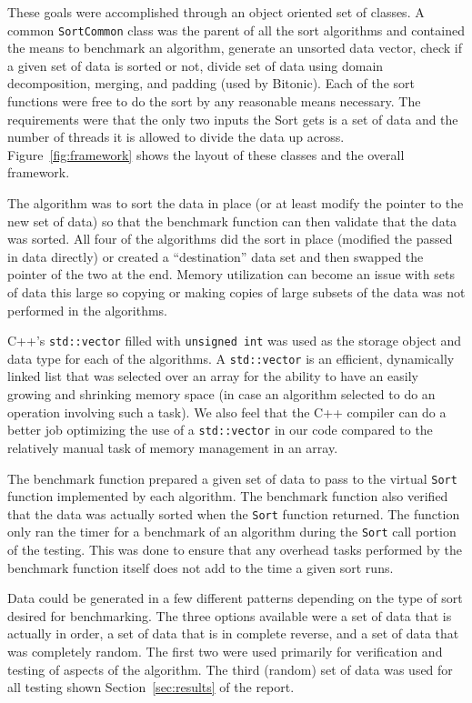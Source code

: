 \documentclass[journal]{IEEEtran}
\begin{document}
These goals were accomplished through an object oriented set of classes. A common \texttt{SortCommon} class was the parent of all the sort algorithms and contained the means to benchmark an algorithm, generate an unsorted data vector, check if a given set of data is sorted or not, divide set of data using domain decomposition, merging, and padding (used by Bitonic). Each of the sort functions were free to do the sort by any reasonable means necessary. The requirements were that the only two inputs the Sort gets is a set of data and the number of threads it is allowed to divide the data up across. Figure~\ref{fig:framework} shows the layout of these classes and the overall framework.

The algorithm was to sort the data in place (or at least modify the pointer to the new set of data) so that the benchmark function can then validate that the data was sorted. All four of the algorithms did the sort in place (modified the passed in data directly) or created a ``destination'' data set and then swapped the pointer of the two at the end. Memory utilization can become an issue with sets of data this large so copying or making copies of large subsets of the data was not performed in the algorithms.

C++'s \texttt{std::vector} filled with \texttt{unsigned int} was used as the storage object and data type for each of the algorithms. A \texttt{std::vector} is an efficient, dynamically linked list that was selected over an array for the ability to have an easily growing and shrinking memory space (in case an algorithm selected to do an operation involving such a task). We also feel that the C++ compiler can do a better job optimizing the use of a \texttt{std::vector} in our code compared to the relatively manual task of memory management in an array.

The benchmark function prepared a given set of data to pass to the virtual \texttt{Sort} function implemented by each algorithm. The benchmark function also verified that the data was actually sorted when the \texttt{Sort} function returned. The function only ran the timer for a benchmark of an algorithm during the \texttt{Sort} call portion of the testing. This was done to ensure that any overhead tasks performed by the benchmark function itself does not add to the time a given sort runs.

Data could be generated in a few different patterns depending on the type of sort desired for benchmarking. The three options available were a set of data that is actually in order, a set of data that is in complete reverse, and a set of data that was completely random. The first two were used primarily for verification and testing of aspects of the algorithm. The third (random) set of data was used for all testing shown Section~\ref{sec:results} of the report.
\end{document}
